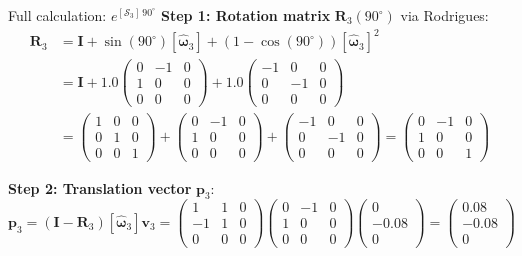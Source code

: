 \documentclass[12pt,a4paper]{article}
\newcommand{\vect}[1]{\bm{#1}}
\newcommand{\mat}[1]{\mathbf{#1}}
\begin{document}
\begin{mathbox}{Full calculation: $e^{[\mathcal{S}_3]\,90^\circ}$}
\textbf{Step 1: Rotation matrix} $\mat{R}_3(90^\circ)$ via Rodrigues:
\begin{align*}
  \mat{R}_3
  &= \mat{I} + \sin(90^\circ)[\vect{\hat\omega}_3] + (1-\cos(90^\circ))[\vect{\hat\omega}_3]^2 \\
  &= \mat{I} + 1.0\begin{pmatrix}0&-1&0\\1&0&0\\0&0&0\end{pmatrix}
           + 1.0\begin{pmatrix}-1&0&0\\0&-1&0\\0&0&0\end{pmatrix} \\[6pt]
  &= \begin{pmatrix}1&0&0\\0&1&0\\0&0&1\end{pmatrix}
   + \begin{pmatrix}0&-1&0\\1&0&0\\0&0&0\end{pmatrix}
   + \begin{pmatrix}-1&0&0\\0&-1&0\\0&0&0\end{pmatrix}
   = \begin{pmatrix}0&-1&0\\1&0&0\\0&0&1\end{pmatrix}
\end{align*}

\textbf{Step 2: Translation vector} $\vect{p}_3$:
\[
  \vect{p}_3
  = (\mat{I}-\mat{R}_3)[\vect{\hat\omega}_3]\vect{v}_3
  = \begin{pmatrix}1&1&0\\-1&1&0\\0&0&0\end{pmatrix}
    \begin{pmatrix}0&-1&0\\1&0&0\\0&0&0\end{pmatrix}
    \begin{pmatrix}0\\-0.08\\0\end{pmatrix}
  = \begin{pmatrix}0.08\\-0.08\\0\end{pmatrix}
\]


\end{mathbox}
\end{document}
